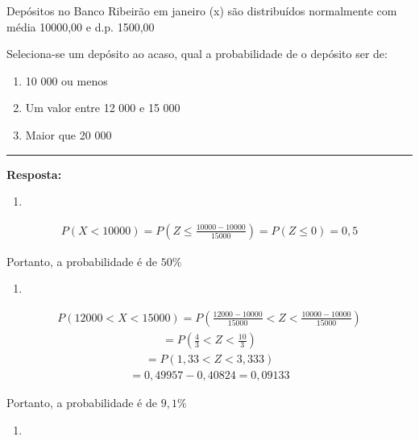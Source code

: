 \documentclass[
  letterpaper,
  DIV=11,
  numbers=noendperiod]{scrartcl}
\providecommand{\tightlist}{%
  \setlength{\itemsep}{0pt}\setlength{\parskip}{0pt}}
\begin{document}
\begin{exemplo}

Depósitos no Banco Ribeirão em janeiro (x) são distribuídos normalmente
com média 10000,00 e d.p. 1500,00

Seleciona-se um depósito ao acaso, qual a probabilidade de o depósito
ser de:

\begin{enumerate}
\def\labelenumi{\alph{enumi}.}
\item
  10 000 ou menos
\item
  Um valor entre 12 000 e 15 000
\item
  Maior que 20 000
\end{enumerate}

\begin{center}\rule{0.5\linewidth}{0.5pt}\end{center}

\textbf{Resposta:}

\begin{enumerate}
\def\labelenumi{\alph{enumi}.}
\tightlist
\item
\end{enumerate}

\[\begin{array}{ccc}
P(X<10000)=P(Z \leq \frac{10000-10000}{15000})=P(Z\leq 0) = 0,5
\end{array}\]

Portanto, a probabilidade é de \(50\%\)

\begin{enumerate}
\def\labelenumi{\alph{enumi}.}
\setcounter{enumi}{1}
\tightlist
\item
\end{enumerate}

\[\begin{array}{ccc}
P(12000<X<15000)=P(\frac{12000-10000}{15000} < Z < \frac{10000-10000}{15000})
\end{array}\] \[\begin{array}{ccc}
= P(\frac{4}{3} < Z < \frac{10}{3})
\end{array}\] \[\begin{array}{ccc}
=P(1,33<Z<3,333) 
\end{array}\] \[\begin{array}{ccc}
=0,49957 - 0,40824 = 0,09133
\end{array}\]

Portanto, a probabilidade é de \(9,1\%\)

\begin{enumerate}
\def\labelenumi{\alph{enumi}.}
\setcounter{enumi}{2}
\tightlist
\item
\end{enumerate}


\end{exemplo}
\end{document}
